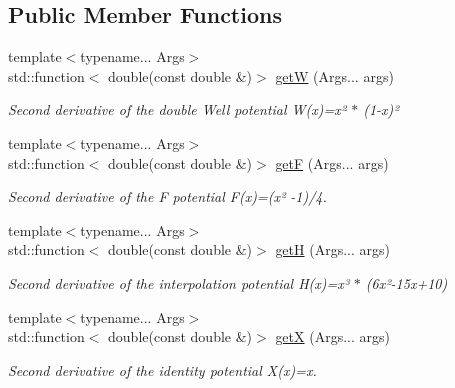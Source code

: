 \subsection*{Public Member Functions}
\begin{DoxyCompactItemize}
\item 
{\footnotesize template$<$typename... Args$>$ }\\std\+::function$<$ double(const double \&)$>$ \hyperlink{structpotential__function_3_012_00_01ThermodynamicsPotentialDiscretization_1_1Implicit_01_4_aa1307003df5d4f4a8bd2fee5966e5a2c}{getW} (Args... args)
\begin{DoxyCompactList}\small\item\em Second derivative of the double Well potential W(x)=x² $\ast$ (1-\/x)² \end{DoxyCompactList}\item 
{\footnotesize template$<$typename... Args$>$ }\\std\+::function$<$ double(const double \&)$>$ \hyperlink{structpotential__function_3_012_00_01ThermodynamicsPotentialDiscretization_1_1Implicit_01_4_a574cf32bb9412402a3e3e722807e8480}{getF} (Args... args)
\begin{DoxyCompactList}\small\item\em Second derivative of the F potential F(x)=(x² -\/1)/4. \end{DoxyCompactList}\item 
{\footnotesize template$<$typename... Args$>$ }\\std\+::function$<$ double(const double \&)$>$ \hyperlink{structpotential__function_3_012_00_01ThermodynamicsPotentialDiscretization_1_1Implicit_01_4_a5ff176022201ec370f5b417d4c2fe31a}{getH} (Args... args)
\begin{DoxyCompactList}\small\item\em Second derivative of the interpolation potential H(x)=x³ $\ast$ (6x²-\/15x+10) \end{DoxyCompactList}\item 
{\footnotesize template$<$typename... Args$>$ }\\std\+::function$<$ double(const double \&)$>$ \hyperlink{structpotential__function_3_012_00_01ThermodynamicsPotentialDiscretization_1_1Implicit_01_4_ab54d081097ca142aba4b7f4fc4a50f3b}{getX} (Args... args)
\begin{DoxyCompactList}\small\item\em Second derivative of the identity potential X(x)=x. \end{DoxyCompactList}\end{DoxyCompactItemize}


